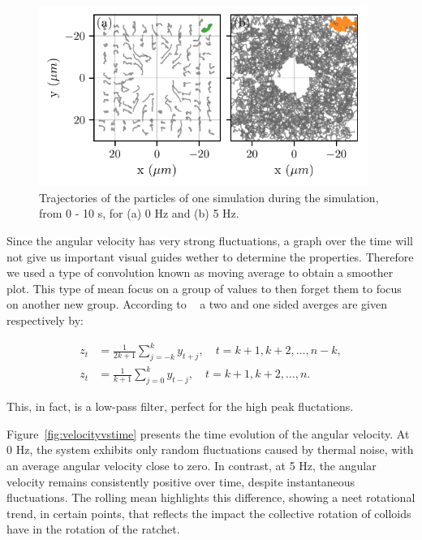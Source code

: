 \begin{figure}[h]
\begin{center}
\includegraphics[width=0.95\textwidth]{figures/parttrj.pdf}
\end{center}
\caption[Particle trajectories at different driving frequencies.]
{Trajectories of the particles of one simulation during the simulation, from 0 - 10 s, for (a) 0 Hz and (b) 5 Hz.}
\label{fig:particletrj}
\end{figure}

Since the angular velocity has very strong fluctuations, a graph over the time will not give us important visual guides wether to determine the properties. Therefore we used a type of convolution known as moving average to obtain a smoother plot. This type of mean focus on a group of values to then forget them to focus on another new group. According to ~\cite{hyndman2025moving} a two and one sided averges are given respectively by:

\begin{align}
  z_t &= \frac{1}{2k+1} \sum^{k}_{j =-k} y_{t+j}, \quad t=k+1, k+2,\dots,n-k,\\
  z_t &= \frac{1}{k+1} \sum^{k}_{j =0} y_{t-j}, \quad t=k+1, k+2,\dots,n.
  \label{eq:movingaverage}
\end{align}

This, in fact, is a low-pass filter, perfect for the high peak fluctations.

Figure~\ref{fig:velocityvstime} presents the time evolution of the angular velocity. At 0 Hz, the system exhibits only random fluctuations caused by thermal noise, with an average angular velocity close to zero. In contrast, at 5 Hz, the angular velocity remains consistently positive over time, despite instantaneous fluctuations. The rolling mean highlights this difference, showing a neet rotational trend, in certain points, that reflects the impact the collective rotation of colloids have in the rotation of the ratchet.


